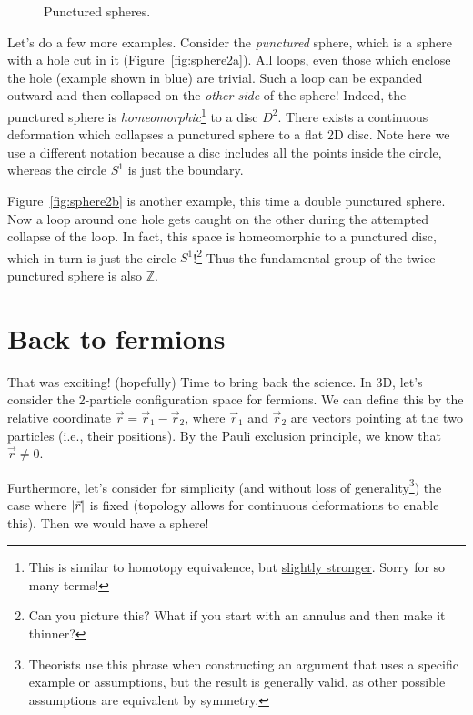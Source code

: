 \documentclass[12pt, english]{book}
\begin{document}
\begin{figure}[!ht]
	\centering 
	\caption{Punctured spheres.}
	\label{fig:sphere2}
\end{figure}

Let's do a few more examples. 
Consider the \emph{punctured} sphere, which is a sphere with a hole cut in it (Figure~\ref{fig:sphere2a}).
All loops, even those which enclose the hole (example shown in blue) are trivial.
Such a loop can be expanded outward and then collapsed on the \emph{other side} of the sphere!
Indeed, the punctured sphere is \emph{homeomorphic}\footnote{This is similar to homotopy equivalence, but \href{https://en.wikipedia.org/wiki/Homotopy\#Homotopy_equivalence_vs._homeomorphism}{slightly stronger}. Sorry for so many terms!} to a disc $D^2$.
There exists a continuous deformation which collapses a punctured sphere to a flat 2D disc.
Note here we use a different notation because a disc includes all the points inside the circle, whereas the circle $S^1$ is just the boundary.

Figure~\ref{fig:sphere2b} is another example, this time a double punctured sphere.
Now a loop around one hole gets caught on the other during the attempted collapse of the loop.
In fact, this space is homeomorphic to a punctured disc, which in turn is just the circle $S^1$!\footnote{Can you picture this? What if you start with an annulus and then make it thinner?} 
Thus the fundamental group of the twice-punctured sphere is also $\mathbb{Z}$.



\section{Back to fermions}

That was exciting! (hopefully)
Time to bring back the science.
In 3D, let's consider the 2-particle configuration space for fermions.
We can define this by the relative coordinate $\vec{r} = \vec{r}_1 - \vec{r}_2$, where $\vec{r}_1$ and $\vec{r}_2$ are vectors pointing at the two particles (i.e., their positions).
By the Pauli exclusion principle, we know that $\vec{r} \neq 0$.

Furthermore, let's consider for simplicity (and without loss of generality\footnote{Theorists use this phrase when constructing an argument that uses a specific example or assumptions, but the result is generally valid, as other possible assumptions are equivalent by symmetry.}) the case where $\abs{\vec{r}}$ is fixed (topology allows for continuous deformations to enable this).
Then we would have a sphere!
\end{document}
